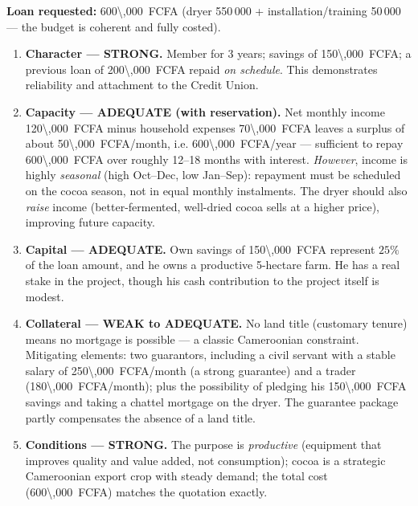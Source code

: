 \documentclass[11pt]{article}
\begin{document}
\begin{corrige}

\textbf{Loan requested:} \SI{600\,000}{FCFA} (dryer 550\,000 + installation/training 50\,000 — the budget is coherent and fully costed).

\begin{enumerate}
\item \textbf{Character — STRONG.} Member for 3 years; savings of \SI{150\,000}{FCFA}; a previous loan of \SI{200\,000}{FCFA} repaid \emph{on schedule}. This demonstrates reliability and attachment to the Credit Union.

\item \textbf{Capacity — ADEQUATE (with reservation).} Net monthly income \SI{120\,000}{FCFA} minus household expenses \SI{70\,000}{FCFA} leaves a surplus of about \SI{50\,000}{FCFA}/month, i.e. \SI{600\,000}{FCFA}/year — sufficient to repay \SI{600\,000}{FCFA} over roughly 12--18 months with interest. \emph{However}, income is highly \emph{seasonal} (high Oct--Dec, low Jan--Sep): repayment must be scheduled on the cocoa season, not in equal monthly instalments. The dryer should also \emph{raise} income (better-fermented, well-dried cocoa sells at a higher price), improving future capacity.

\item \textbf{Capital — ADEQUATE.} Own savings of \SI{150\,000}{FCFA} represent $25\%$ of the loan amount, and he owns a productive 5-hectare farm. He has a real stake in the project, though his cash contribution to the project itself is modest.

\item \textbf{Collateral — WEAK to ADEQUATE.} No land title (customary tenure) means no mortgage is possible — a classic Cameroonian constraint. Mitigating elements: two guarantors, including a civil servant with a stable salary of \SI{250\,000}{FCFA}/month (a strong guarantee) and a trader (\SI{180\,000}{FCFA}/month); plus the possibility of pledging his \SI{150\,000}{FCFA} savings and taking a chattel mortgage on the dryer. The guarantee package partly compensates the absence of a land title.

\item \textbf{Conditions — STRONG.} The purpose is \emph{productive} (equipment that improves quality and value added, not consumption); cocoa is a strategic Cameroonian export crop with steady demand; the total cost (\SI{600\,000}{FCFA}) matches the quotation exactly.
\end{enumerate}


\end{corrige}
\end{document}
